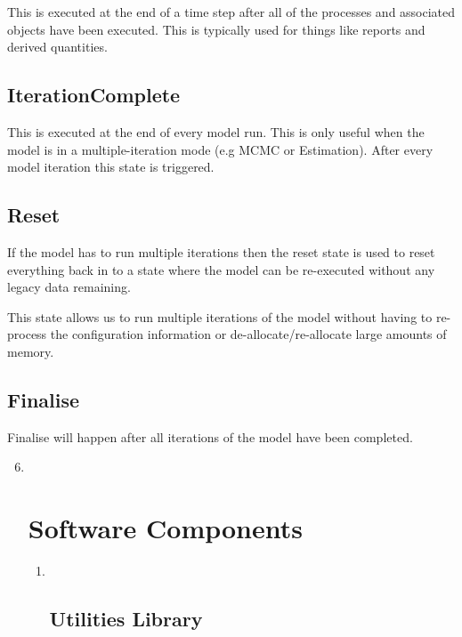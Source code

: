 \documentclass[a4paper,11pt,twoside,pdftex,draft]{article}
\begin{document}
This is executed at the end of a time step after all of the processes
and associated objects have been executed. This is typically used for
things like reports and derived quantities.

\hypertarget{iterationcomplete}{%
\subsection{IterationComplete}\label{iterationcomplete}}

This is executed at the end of every model run. This is only useful when
the model is in a multiple-iteration mode (e.g MCMC or Estimation).
After every model iteration this state is triggered.

\hypertarget{reset}{%
\subsection{Reset}\label{reset}}

If the model has to run multiple iterations then the reset state is used
to reset everything back in to a state where the model can be
re-executed without any legacy data remaining.

This state allows us to run multiple iterations of the model without
having to re-process the configuration information or
de-allocate/re-allocate large amounts of memory.

\hypertarget{finalise}{%
\subsection{Finalise}\label{finalise}}

Finalise will happen after all iterations of the model have been
completed.

\begin{enumerate}
\setcounter{enumi}{5}
\item ~
  \hypertarget{software-components}{%
  \section{Software Components}\label{software-components}}

  \begin{enumerate}
  \item ~
    \hypertarget{utilities-library}{%
    \subsection{Utilities Library}\label{utilities-library}}
  \end{enumerate}
\end{enumerate}
\end{document}
